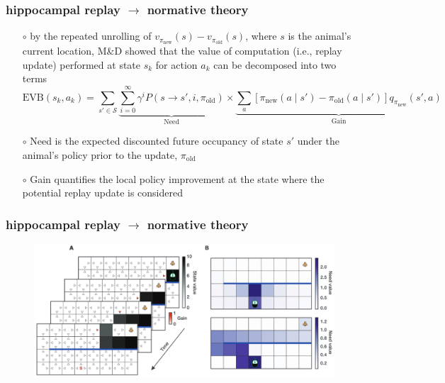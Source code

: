 \documentclass[aspectratio=169]{beamer}
\newcommand{\old}{\text{old}}
\newcommand{\new}{\text{new}}
\begin{document}
\begin{frame}
    \frametitle{hippocampal replay $\rightarrow$ normative theory}
    \begin{itemize}
        \item[$\circ$] by the repeated unrolling of $v_{\pi_\new}(s) - v_{\pi_\old}(s)$, where $s$ is the animal's current location, M\&D showed that 
        the value of computation (i.e., replay update) performed at state $s_k$ for action $a_k$ can be decomposed into two terms
        $$ \text{EVB}(s_k, a_k) = \sum_{s'\in \mathcal{S}} \underbrace{\sum_{i=0}^{\infty} \gamma^i P(s \rightarrow s', i, \pi_{\old})}_{\text{Need}} \times \underbrace{\sum_a [\pi_{\new}(a\mid s') - \pi_\old (a\mid s')]q_{\pi_\new}(s',a)}_{\text{Gain}} $$
        \item[$\circ$] Need is the expected discounted future occupancy of state $s'$ under the animal's policy prior to the update, $\pi_\old$
        \item[$\circ$] Gain quantifies the local policy improvement at the state where the potential replay update is considered  
    \end{itemize}
\end{frame}

\begin{frame}
    \frametitle{hippocampal replay $\rightarrow$ normative theory}
    \begin{figure}
        \centering
        \includegraphics[width=1\textwidth]{gain_need.png}
    \end{figure}
\end{frame}
\end{document}
